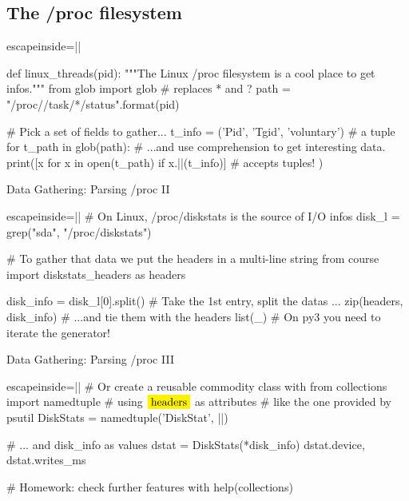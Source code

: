 \subsection{The /proc filesystem}
\begin{pyframe}{}
\begin{pycode*}{escapeinside=||}

def linux_threads(pid):
  """The Linux /proc filesystem is a cool place to get infos."""
  from glob import glob  # replaces * and ?
  path = "/proc/{}/task/*/status".format(pid)
  
  # Pick a set of fields to gather...
  t_info = ('Pid', 'Tgid', 'voluntary') # a tuple
  for t_path in glob(path):
    # ...and use comprehension to get interesting data.
    print([x for x in open(t_path) 
        if x.||(t_info)] #  accepts tuples!
    )
\end{pycode*}
\end{pyframe}



\begin{pyframe}{Data Gathering: Parsing /proc II}
\begin{pycode*}{escapeinside=||}
# On Linux, /proc/diskstats is the source of I/O infos
disk_l = grep("sda", "/proc/diskstats")

# To gather that data we put the headers in a multi-line string
from course import diskstats_headers as headers
        
disk_info = disk_l[0].split() # Take the 1st entry, split the datas ...
zip(headers, disk_info)          # ...and tie them with the headers
list(_) # On py3 you need to iterate the generator!
\end{pycode*}
\end{pyframe}

\begin{pyframe}{Data Gathering: Parsing /proc III}
\begin{pycode*}{escapeinside=||}
# Or create a reusable commodity class with
from collections import namedtuple
# using $\pyver{headers}$ as attributes
#  like the one provided by psutil
DiskStats = namedtuple('DiskStat', ||)

# ... and disk_info as values
dstat = DiskStats(*disk_info)
dstat.device, dstat.writes_ms

# Homework: check further features with
help(collections) 
\end{pycode*}
\end{pyframe}


\iffalse
\begin{pyframe}{Data Gathering: subprocess}
\begin{pycode}
# foo
\end{pycode}
\end{pyframe}

\fi
